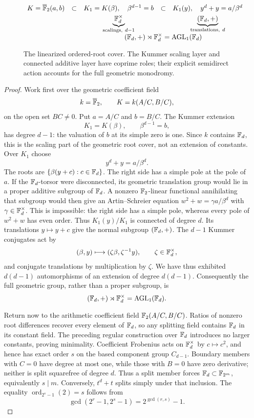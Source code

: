 \begin{figure}[H]
\centering
\[
\begin{array}{ccccc}
K=\overline{\F}_2(a,b)
&\subset&
K_1=K(\beta),\quad \beta^{d-1}=b
&\subset&
K_1(y),\quad y^d+y=a/\beta^d\\[3pt]
&&\underbrace{\F_d^\times}_{\text{scalings},\ d-1}
&&\underbrace{(\F_d,+)}_{\text{translations},\ d}\\[5pt]
&&\multicolumn{3}{c}{
(\F_d,+)\rtimes\F_d^\times=\operatorname{AGL}_1(\F_d)}
\end{array}
\]
\caption{The linearized ordered-root cover.  The Kummer scaling layer
and connected additive layer have coprime roles; their explicit
semidirect action accounts for the full geometric monodromy.}
\label{fig:lucas-monodromy}
\end{figure}

\begin{proof}
Work first over the geometric coefficient field
\[
 k=\overline{\mathbb F}_2,\qquad K=k(A/C,B/C),
\]
on the open set $BC\ne0$.  Put $a=A/C$ and $b=B/C$.  The Kummer
extension
\[
 K_1=K(\beta),\qquad \beta^{d-1}=b,
\]
has degree $d-1$: the valuation of $b$ at its simple zero is one.
Since $k$ contains $\mathbb F_d$, this is the scaling part of the geometric
root cover, not an extension of constants.  Over $K_1$ choose
\[
 y^d+y=a/\beta^d.
\]
The roots are $\{\beta(y+c):c\in\mathbb F_d\}$.  The right side has a simple
pole at the pole of $a$.  If the $\mathbb F_d$-torsor were disconnected, its
geometric translation group would lie in a proper additive subgroup
of $\mathbb F_d$.  A nonzero $\mathbb F_2$-linear functional annihilating that
subgroup would then give an Artin--Schreier equation
$w^2+w=\gamma a/\beta^d$ with $\gamma\in\mathbb F_d^\times$.  This is
impossible: the right side has a simple pole, whereas every pole of
$w^2+w$ has even order.  Thus $K_1(y)/K_1$ is connected of degree
$d$.
Its translations $y\mapsto y+c$ give the normal subgroup
$(\mathbb F_d,+)$.  The $d-1$ Kummer conjugates act by
\[
 (\beta,y)\longmapsto(\zeta\beta,\zeta^{-1}y),
 \qquad \zeta\in\mathbb F_d^\times,
\]
and conjugate translations by multiplication by $\zeta$.  We have
thus exhibited $d(d-1)$ automorphisms of an extension of degree
$d(d-1)$.  Consequently the full geometric group, rather than a
proper subgroup, is
\[
 (\mathbb F_d,+)\rtimes\mathbb F_d^\times
   =\operatorname{AGL}_1(\mathbb F_d).
\]

Return now to the arithmetic coefficient field
$\mathbb F_2(A/C,B/C)$.  Ratios of nonzero root differences recover every
element of $\mathbb F_d$, so any splitting field contains $\mathbb F_d$ in its
constant field.  The preceding regular construction over $\mathbb F_d$
introduces no larger constants, proving minimality.  Coefficient
Frobenius acts on $\mathbb F_d^\times$ by $c\mapsto c^2$, and hence has exact
order $s$ on the based component group $C_{d-1}$.  Boundary members
with $C=0$ have degree at
most one, while those with $B=0$ have zero derivative; neither is split
squarefree of degree $d$.  Thus a split member forces
$\mathbb F_d\subset\mathbb F_{2^m}$, equivalently $s\mid m$.  Conversely, $t^d+t$
splits simply under that inclusion.  The equality
$\operatorname{ord}_{2^s-1}(2)=s$ follows from
\[
\gcd(2^r-1,2^s-1)=2^{\gcd(r,s)}-1.
\]
\end{proof}

